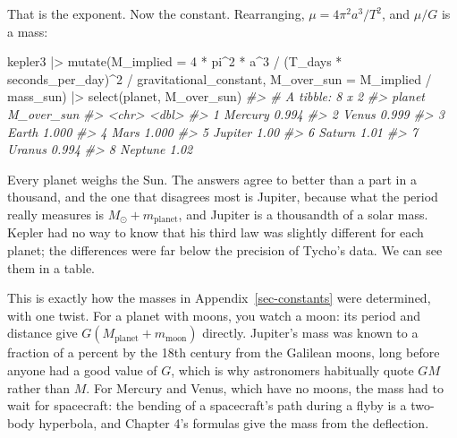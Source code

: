 \documentclass[
  10.5pt,
  letterpaper,
]{scrbook}
\newenvironment{Shaded}{\begin{snugshade}}{\end{snugshade}}
\newcommand{\AttributeTok}[1]{\textcolor[rgb]{0.00,0.00,0.00}{#1}}
\newcommand{\CommentTok}[1]{\textcolor[rgb]{0.00,0.00,0.00}{\textit{#1}}}
\newcommand{\DecValTok}[1]{\textcolor[rgb]{0.00,0.00,0.00}{#1}}
\newcommand{\FunctionTok}[1]{\textcolor[rgb]{0.00,0.00,0.00}{#1}}
\newcommand{\NormalTok}[1]{\textcolor[rgb]{0.00,0.00,0.00}{#1}}
\newcommand{\SpecialCharTok}[1]{\textcolor[rgb]{0.00,0.00,0.00}{#1}}
\theoremstyle{plain}
\theoremstyle{remark}
\begin{document}
That is the exponent. Now the constant. Rearranging,
\(\mu = 4\pi^2 a^3/T^2\), and \(\mu/G\) is a mass:

\begin{Shaded}
\begin{Highlighting}[]
\NormalTok{kepler3 }\SpecialCharTok{|\textgreater{}}
  \FunctionTok{mutate}\NormalTok{(}\AttributeTok{M\_implied =} \DecValTok{4} \SpecialCharTok{*}\NormalTok{ pi}\SpecialCharTok{\^{}}\DecValTok{2} \SpecialCharTok{*}\NormalTok{ a}\SpecialCharTok{\^{}}\DecValTok{3} \SpecialCharTok{/}\NormalTok{ (T\_days }\SpecialCharTok{*}\NormalTok{ seconds\_per\_day)}\SpecialCharTok{\^{}}\DecValTok{2} \SpecialCharTok{/}
\NormalTok{                     gravitational\_constant,}
         \AttributeTok{M\_over\_sun =}\NormalTok{ M\_implied }\SpecialCharTok{/}\NormalTok{ mass\_sun) }\SpecialCharTok{|\textgreater{}}
  \FunctionTok{select}\NormalTok{(planet, M\_over\_sun)}
\CommentTok{\#\textgreater{} \# A tibble: 8 x 2}
\CommentTok{\#\textgreater{}   planet  M\_over\_sun}
\CommentTok{\#\textgreater{}   \textless{}chr\textgreater{}        \textless{}dbl\textgreater{}}
\CommentTok{\#\textgreater{} 1 Mercury      0.994}
\CommentTok{\#\textgreater{} 2 Venus        0.999}
\CommentTok{\#\textgreater{} 3 Earth        1.000}
\CommentTok{\#\textgreater{} 4 Mars         1.000}
\CommentTok{\#\textgreater{} 5 Jupiter      1.00 }
\CommentTok{\#\textgreater{} 6 Saturn       1.01 }
\CommentTok{\#\textgreater{} 7 Uranus       0.994}
\CommentTok{\#\textgreater{} 8 Neptune      1.02}
\end{Highlighting}
\end{Shaded}

Every planet weighs the Sun. The answers agree to better than a part in
a thousand, and the one that disagrees most is Jupiter, because what the
period really measures is \(M_\odot + m_{\mathrm{planet}}\), and Jupiter
is a thousandth of a solar mass. Kepler had no way to know that his
third law was slightly different for each planet; the differences were
far below the precision of Tycho's data. We can see them in a table.

\begin{tcolorbox}[enhanced jigsaw, arc=.35mm, bottomrule=.15mm, bottomtitle=1mm, breakable, colback=white, colbacktitle=quarto-callout-note-color!10!white, colframe=quarto-callout-note-color-frame, coltitle=black, left=2mm, leftrule=.75mm, opacityback=0, opacitybacktitle=0.6, rightrule=.15mm, title={Where it comes from}, titlerule=0mm, toprule=.15mm, toptitle=1mm]

This is exactly how the masses in Appendix~\ref{sec-constants} were
determined, with one twist. For a planet with moons, you watch a moon:
its period and distance give
\(G(M_{\mathrm{planet}} + m_{\mathrm{moon}})\) directly. Jupiter's mass
was known to a fraction of a percent by the 18th century from the
Galilean moons, long before anyone had a good value of \(G\), which is
why astronomers habitually quote \(GM\) rather than \(M\). For Mercury
and Venus, which have no moons, the mass had to wait for spacecraft: the
bending of a spacecraft's path during a flyby is a two-body hyperbola,
and Chapter 4's formulas give the mass from the deflection.

\end{tcolorbox}
\end{document}
